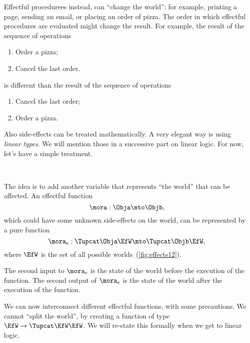 Effectful procedurees instead, can ``change the world'': for example, printing a page, sending an email, or placing an order of pizza.
The order in which effectful procedures are evaluated might change the result.
For example, the result of the sequence of operations
%
\begin{enumerate}
    \item Order a pizza;
    \item Cancel the last order.
\end{enumerate}
%
is different than the result of the sequence of operations
%
\begin{enumerate}
    \item Cancel the last order;
    \item Order a pizza.
\end{enumerate}

Also side-effects can be treated mathematically.
A very elegant way is using \emph{linear types}.
We will mention those in a successive part on linear logic.
For now, let's have a simple treatment.

\begin{marginfigure}
    \centering
    \\
    \caption{}
    \label{fig:effects12}
\end{marginfigure}

The idea is to add another variable that represents ``the world'' that can be affected.
An effectful function
%
\begin{equation}
    \mora: \Obja \mto \Objb,
\end{equation}
%
which could have some unknown side-effects on the world, can be represented by a pure function
%
\begin{equation}
    \mora_e:  \Tupcat \Obja   \EfW \mto   \Tupcat  \Objb \EfW,
\end{equation}
%
where $\EfW$ is the set of all possible worlds~(\cref{fig:effects12}).

The second input to $\mora_e$ is the state of the world before the execution of the function.
The second output of $\mora_e$ is the state of the world after the execution of the function.

We can now interconnect different effectful functions, with some precautions.
We cannot ``split the world'', by creating a function of type $\EfW \to \Tupcat \EfW \EfW$.
We will re-state this formally when we get to linear logic.


